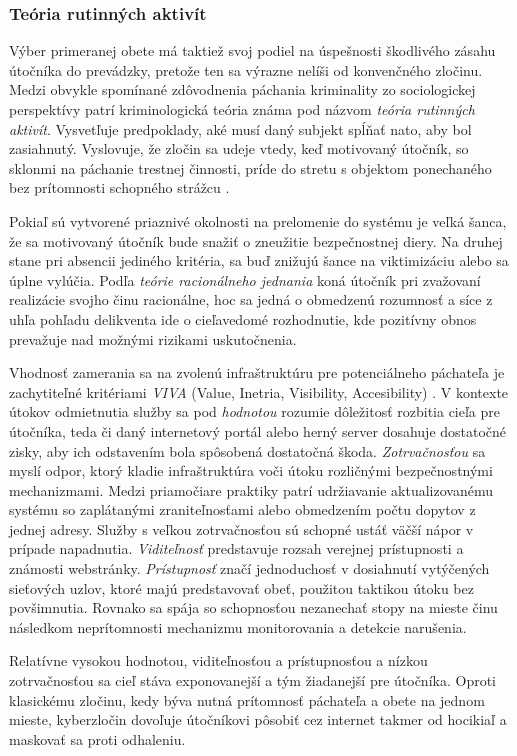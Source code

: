 \documentclass[12pt, a4paper]{article}
\begin{document}
\subsubsection{Teória rutinných aktivít}
Výber primeranej obete má taktiež svoj podiel na úspešnosti škodlivého zásahu útočníka do prevádzky,
pretože ten sa výrazne nelíši od konvenčného zločinu. Medzi obvykle spomínané zdôvodnenia páchania 
kriminality zo sociologickej perspektívy patrí kriminologická teória známa pod názvom 
\emph{teória rutinných aktivít}. Vysvetľuje predpoklady, aké musí daný subjekt spĺňať nato, aby bol 
zasiahnutý. Vyslovuje, že zločin sa udeje vtedy, keď motivovaný útočník, so sklonmi na páchanie trestnej 
činnosti, príde do stretu s objektom ponechaného bez prítomnosti schopného strážcu \cite{cohen-felson}.

Pokiaľ sú vytvorené priaznivé okolnosti na prelomenie do systému je veľká šanca, že sa motivovaný útočník 
bude snažiť o zneužitie bezpečnostnej diery. Na druhej stane pri absencii jediného kritéria, sa buď 
znižujú šance na viktimizáciu alebo sa úplne vylúčia. Podľa \emph{teórie racionálneho jednania} koná 
útočník pri zvažovaní realizácie svojho činu racionálne, hoc sa jedná o obmedzenú rozumnosť a síce z uhľa 
pohľadu delikventa ide o cieľavedomé rozhodnutie, kde pozitívny obnos prevažuje nad možnými rizikami 
uskutočnenia.

Vhodnosť zamerania sa na zvolenú infraštruktúru pre potenciálneho páchateľa je zachytiteľné kritériami 
\emph{VIVA} (Value, Inetria, Visibility, Accesibility) \cite{why-attack}. V kontexte útokov odmietnutia 
služby sa pod \emph{hodnotou} rozumie dôležitosť rozbitia cieľa pre útočníka, teda či daný internetový 
portál alebo herný server dosahuje dostatočné zisky, aby ich odstavením bola spôsobená dostatočná škoda. 
\emph{Zotrvačnosťou} sa myslí odpor, ktorý kladie infraštruktúra voči útoku rozličnými bezpečnostnými 
mechanizmami. Medzi priamočiare praktiky patrí udržiavanie aktualizovanému systému so zaplátanými 
zraniteľnosťami alebo obmedzením počtu dopytov z jednej adresy. Služby s veľkou zotrvačnosťou sú schopné 
ustáť väčší nápor v prípade napadnutia. \emph{Viditeľnosť} predstavuje rozsah verejnej prístupnosti a 
známosti webstránky. \emph{Prístupnosť} značí jednoduchosť v dosiahnutí vytýčených sieťových 
uzlov, ktoré majú predstavovať obeť, použitou taktikou útoku bez povšimnutia. Rovnako sa spája so 
schopnosťou nezanechať stopy na mieste činu následkom neprítomnosti mechanizmu monitorovania a detekcie 
narušenia. 

Relatívne vysokou hodnotou, viditeľnosťou a prístupnosťou a nízkou zotrvačnosťou sa cieľ stáva 
exponovanejší a tým žiadanejší pre útočníka. Oproti klasickému zločinu, kedy býva nutná 
prítomnosť páchateľa a obete na jednom mieste, kyberzločin dovoľuje útočníkovi pôsobiť cez internet takmer 
od hocikiaľ a maskovať sa proti odhaleniu.
\end{document}
